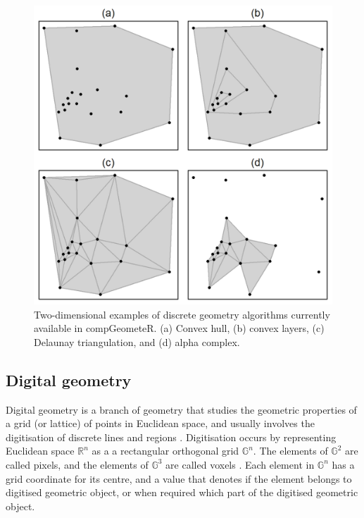 \documentclass[12pt, a4paper]{article}
\begin{document}
\begin{figure}[ht]
\centering
\includegraphics{figures/figure-1/figure-1.png}
\caption{Two-dimensional examples of discrete geometry algorithms currently available in compGeometeR. (a) Convex hull, (b) convex layers, (c) Delaunay triangulation, and (d) alpha complex.}
\label{fig:euclidean-algorithms}
\end{figure}


\subsection{Digital geometry}

Digital geometry is a branch of geometry that studies the geometric properties of a grid (or lattice) of points in Euclidean space, and usually involves the digitisation of discrete lines and regions \citep{rosenfeld-1989}.  Digitisation occurs by representing Euclidean space $\mathbb{R}^n$ as a a rectangular orthogonal grid $\mathbb{G}^n$.  The elements of $\mathbb{G}^2$ are called pixels, and the elements of $\mathbb{G}^3$ are called voxels \citep{klette-2004}.  Each element in $\mathbb{G}^n$ has a grid coordinate for its centre, and a value that denotes if the element belongs to digitised geometric object, or when required which part of the digitised geometric object.
\end{document}
